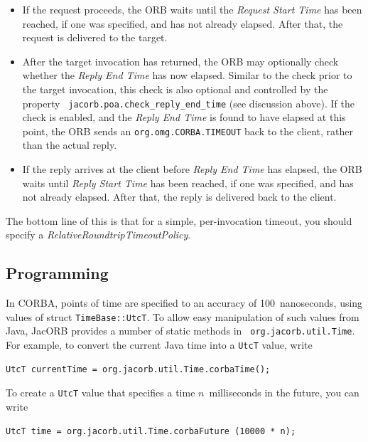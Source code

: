 \begin{itemize}
\item If the request proceeds, the ORB waits until the \emph{Request
Start Time} has been reached, if one was specified, and has not
already elapsed.  After that, the request is delivered to the target.

\item After the target invocation has returned, the ORB may
optionally check whether the \emph{Reply End Time} has now elapsed.
Similar to the check prior to the target invocation, this check is
also optional and controlled by the property {\tt
jacorb.poa.check\_reply\_end\_time} (see discussion above).  If
the check is enabled, and the \emph{Reply End Time} is found to have
elapsed at this point, the ORB sends an {\tt org.omg.CORBA.TIMEOUT}
back to the client, rather than the actual reply.

\item If the reply arrives at the client before \emph{Reply End Time}
has elapsed, the ORB waits until \emph{Reply Start Time} has been
reached, if one was specified, and has not already elapsed.  After
that, the reply is delivered back to the client.

\end{itemize}

The bottom line of this is that for a simple, per-invocation timeout,
you should specify a \mbox{\emph{RelativeRoundtripTimeoutPolicy}}.

\clearpage{}
\subsection*{Programming}

In CORBA, points of time are specified to an accuracy of 100~nanoseconds, using
values of struct {\tt TimeBase::UtcT}.  To allow easy manipulation of such
values from Java, JacORB provides a number of static methods in {\tt
org.jacorb.util.Time}.  For example, to convert the current Java time
into a {\tt UtcT} value, write

\begin{verbatim}
UtcT currentTime = org.jacorb.util.Time.corbaTime();
\end{verbatim}

To create a {\tt UtcT} value that specifies a time $n$~milliseconds in the
future, you can write

\begin{verbatim}
UtcT time = org.jacorb.util.Time.corbaFuture (10000 * n);
\end{verbatim}

